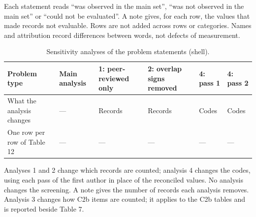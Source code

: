 \begin{table}[!htbp]
\smallskip
\raggedright\footnotesize Each statement reads ``was observed in the main set'', ``was not observed in the main set''
or ``could not be evaluated''. A note gives, for each row, the values that made records not evaluable. Rows are not added
across rows or categories. Names and attribution record differences between words, not defects of measurement.
\end{table}

\begin{table}[!htbp]
\centering
\caption{Sensitivity analyses of the problem statements (shell).}
\small
\begin{tabularx}{\linewidth}{XXXXXX}
\toprule
Problem type & Main analysis & 1: peer-reviewed only & 2: overlap signs removed & 4: pass 1 & 4: pass 2 \\
\midrule
What the analysis changes & --- & Records & Records & Codes & Codes \\
One row per row of Table 12 & --- & --- & --- & --- & --- \\
\bottomrule
\end{tabularx}

\smallskip
\raggedright\footnotesize Analyses 1 and 2 change which records are counted; analysis 4 changes the codes, using each
pass of the first author in place of the reconciled values. No analysis changes the screening. A note gives the number
of records each analysis removes. Analysis 3 changes how C2b items are counted; it applies to the C2b tables and is
reported beside Table 7.
\end{table}


